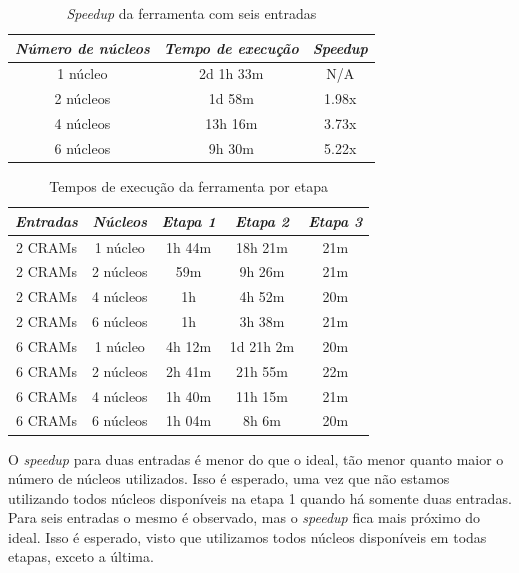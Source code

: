 \documentclass[cic,tc]{iiufrgs}
\begin{document}
{\begin{table}[h]
    \caption{\textit{Speedup} da ferramenta com seis entradas}
    \centering
        \begin{tabular}{c|c|c}
          \hline
          \textit{Número de núcleos}  &   \textit{Tempo de execução}  & \textit{Speedup} \\
          \hline
          \hline
          1 núcleo & 2d 1h 33m & N/A \\
          2 núcleos & 1d 58m & 1.98x \\
          4 núcleos & 13h 16m & 3.73x \\
          6 núcleos & 9h 30m & 5.22x \\
          \hline
        \end{tabular}
    \label{tbl:speedup6}
\end{table}

\begin{table}[h]
    \caption{Tempos de execução da ferramenta por etapa}
    \centering
        \begin{tabular}{c|c|c|c|c}
          \hline
          \textit{Entradas}  & \textit{Núcleos} & \textit{Etapa 1}  & \textit{Etapa 2} & \textit{Etapa 3} \\
          \hline
          \hline
          2 CRAMs & 1 núcleo  & 1h 44m &    18h 21m & 21m \\
          2 CRAMs & 2 núcleos &    59m &     9h 26m & 21m \\
          2 CRAMs & 4 núcleos & 1h     &     4h 52m & 20m \\
          2 CRAMs & 6 núcleos & 1h     &     3h 38m & 21m \\
          6 CRAMs & 1 núcleo  & 4h 12m & 1d 21h  2m & 20m \\
          6 CRAMs & 2 núcleos & 2h 41m &    21h 55m & 22m \\
          6 CRAMs & 4 núcleos & 1h 40m &    11h 15m & 21m \\
          6 CRAMs & 6 núcleos & 1h 04m &     8h  6m & 20m \\
          \hline
        \end{tabular}
    \label{tbl:stages}
\end{table}

O \textit{speedup} para duas entradas é menor do que o ideal, tão menor quanto maior o
número de núcleos utilizados. Isso é esperado, uma vez que não estamos
utilizando todos núcleos disponíveis na etapa 1 quando há somente duas
entradas. Para seis entradas o mesmo é observado, mas o \textit{speedup} fica mais
próximo do ideal. Isso é esperado, visto que utilizamos todos núcleos
disponíveis em todas etapas, exceto a última.

}
\end{document}
